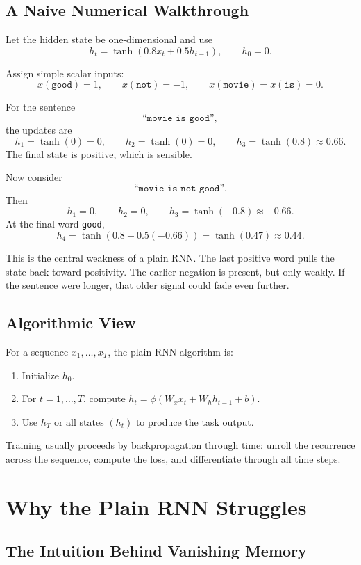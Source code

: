 \documentclass[12pt,a4paper]{article}
\begin{document}
\subsection{A Naive Numerical Walkthrough}

Let the hidden state be one-dimensional and use
\[
h_t = \tanh(0.8x_t + 0.5h_{t-1}),
\qquad
h_0 = 0.
\]

Assign simple scalar inputs:
\[
x(\texttt{good}) = 1,\qquad
x(\texttt{not}) = -1,\qquad
x(\texttt{movie}) = x(\texttt{is}) = 0.
\]

For the sentence
\[
\texttt{``movie is good''},
\]
the updates are
\[
h_1 = \tanh(0) = 0,\qquad
h_2 = \tanh(0) = 0,\qquad
h_3 = \tanh(0.8) \approx 0.66.
\]
The final state is positive, which is sensible.

Now consider
\[
\texttt{``movie is not good''}.
\]
Then
\[
h_1 = 0,\qquad
h_2 = 0,\qquad
h_3 = \tanh(-0.8) \approx -0.66.
\]
At the final word \texttt{good},
\[
h_4 = \tanh(0.8 + 0.5(-0.66))
     = \tanh(0.47)
     \approx 0.44.
\]

This is the central weakness of a plain RNN. The last positive word pulls the state back toward positivity. The earlier negation is present, but only weakly. If the sentence were longer, that older signal could fade even further.

\subsection{Algorithmic View}

For a sequence \(x_1,\dots,x_T\), the plain RNN algorithm is:

\begin{enumerate}
  \item Initialize \(h_0\).
  \item For \(t=1,\dots,T\), compute \(h_t = \phi(W_x x_t + W_h h_{t-1} + b)\).
  \item Use \(h_T\) or all states \((h_t)\) to produce the task output.
\end{enumerate}

Training usually proceeds by backpropagation through time: unroll the recurrence across the sequence, compute the loss, and differentiate through all time steps.

\section{Why the Plain RNN Struggles}

\subsection{The Intuition Behind Vanishing Memory}
\end{document}
